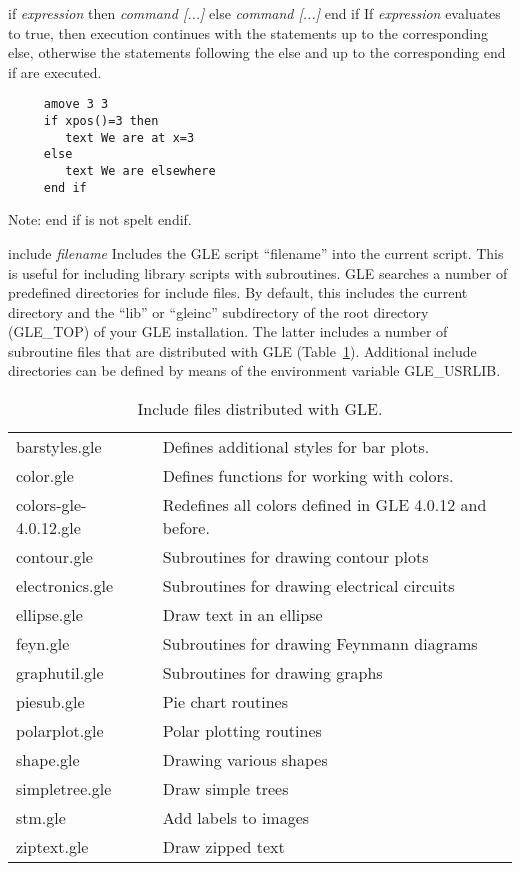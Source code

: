 \begin{commanddescription}
\item[{\sf if {\it expression} then {\it command [...]} else {\it command [...]} end if}]
If {\it expression} evaluates to true, then execution continues with the
statements up to the corresponding {\sf else}, otherwise the statements
following the {\sf else} and up to the corresponding {\sf end if} are executed.

\preglecode{}
\begin{Verbatim}
     amove 3 3
     if xpos()=3 then
        text We are at x=3
     else
        text We are elsewhere
     end if
\end{Verbatim}
\postglecode{}

Note: {\sf end if} is not spelt {\sf endif}.

\item[{\sf include {\it filename}}]\label{incl:cmnd}
 Includes the GLE script ``filename'' into the current script. This is useful for including library scripts with subroutines. GLE searches a number of predefined directories for include files. By default, this includes the current directory and the ``lib'' or ``gleinc'' subdirectory of the root directory (GLE\_TOP) of your GLE installation. The latter includes a number of subroutine files that are distributed with GLE (Table~\ref{inc:tab}). Additional include directories can be defined by means of the environment variable GLE\_USRLIB.

\begin{table}[t]
\centering
\caption{\label{inc:tab}Include files distributed with GLE.}
\begin{tabular}{ll} \hline
barstyles.gle             & Defines additional styles for bar plots.\\
color.gle                 & Defines functions for working with colors.\\
colors-gle-4.0.12.gle     & Redefines all colors defined in GLE 4.0.12 and before.\\
contour.gle               & Subroutines for drawing contour plots\\
electronics.gle           & Subroutines for drawing electrical circuits\\
ellipse.gle               & Draw text in an ellipse\\
feyn.gle                  & Subroutines for drawing Feynmann diagrams\\
graphutil.gle             & Subroutines for drawing graphs\\
piesub.gle                & Pie chart routines\\
polarplot.gle             & Polar plotting routines\\
shape.gle                 & Drawing various shapes\\
simpletree.gle            & Draw simple trees\\
stm.gle                   & Add labels to images\\
ziptext.gle               & Draw zipped text\\ \hline
\end{tabular}
\end{table}


\end{commanddescription}
